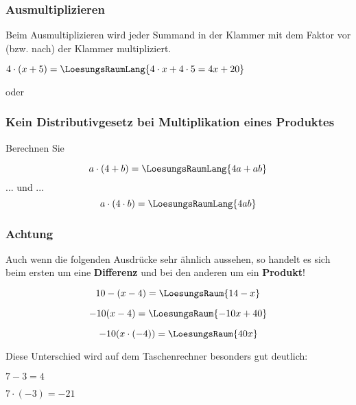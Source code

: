 \subsubsection{Ausmultiplizieren}
Beim Ausmultiplizieren wird jeder Summand in der Klammer mit dem
Faktor vor (bzw. nach) der Klammer multipliziert.
\begin{beispiel}{}{}
  $4\cdot (x + 5) =\LoesungsRaumLang{4\cdot x + 4\cdot 5 = 4x + 20}$
\end{beispiel}

\begin{beispiel}{}{}
oder \TRAINER{\\}
\end{beispiel}

\subsubsection{Kein Distributivgesetz bei Multiplikation eines Produktes}
Berechnen Sie

$$a\cdot{}(4+b) = \LoesungsRaumLang{4a + ab}$$
 ... und ...
$$ a\cdot{}(4\cdot{}b) = \LoesungsRaumLang{4ab} $$

\newpage

\subsubsection{Achtung}
Auch wenn die folgenden Ausdrücke sehr ähnlich aussehen, so
handelt es sich beim ersten um eine \textbf{Differenz} und bei den anderen um
ein \textbf{Produkt}!

$$10-(x-4) =\LoesungsRaum{14-x}$$

$$-10(x-4) = \LoesungsRaum{-10x + 40}$$

$$-10(x\cdot{}(-4)) = \LoesungsRaum{40x}$$

Diese Unterschied wird auf dem Taschenrechner besonders gut deutlich:

    $ 7 - 3 = 4$

\vspace{3mm}
   $ 7\cdot{}(-3) = -21$


